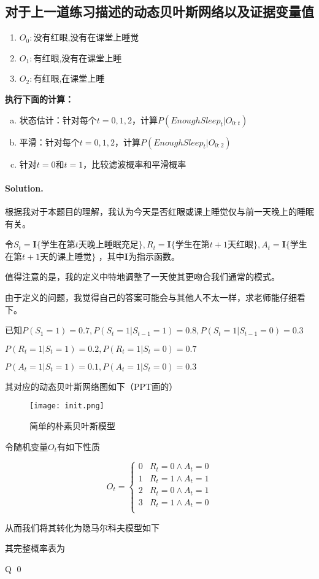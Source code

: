 \documentclass[UTF8]{ctexart}
\newenvironment{solution}
{\color{blue} \paragraph{Solution.}}
{\newline \qed}
\begin{document}
\subsection{对于上一道练习描述的动态贝叶斯网络以及证据变量值}
\begin{enumerate}[1)]
    \item $O_0:$没有红眼,没有在课堂上睡觉
    \item $O_1:$有红眼,没有在课堂上睡
    \item $O_2:$有红眼,在课堂上睡
\end{enumerate}
\textbf{执行下面的计算：}
\begin{enumerate}[a)]
    \item 状态估计：针对每个$t = 0, 1, 2$，计算$P(EnoughSleep_t|O_{0:t})$
    \item 平滑：针对每个$t = 0, 1, 2$，计算$P(EnoughSleep_t|O_{0:2})$
    \item 针对$t=0$和$t=1$，比较滤波概率和平滑概率
\end{enumerate}
\begin{solution}
    根据我对于本题目的理解，我认为今天是否红眼或课上睡觉仅与前一天晚上的睡眠有关。


    令$S_t=\mathbf{I}\{$学生在第$t$天晚上睡眠充足$\},R_t=\mathbf{I}\{$学生在第$t+1$天红眼$\},A_t=\mathbf{I}\{$学生在第$t+1$天的课上睡觉$\}$
    ，其中$\mathbf{I}$为指示函数。

    值得注意的是，我的定义中特地调整了一天使其更吻合我们通常的模式。

    由于定义的问题，我觉得自己的答案可能会与其他人不太一样，求老师能仔细看下。 

    已知$P(S_1=1)=0.7,P(S_t=1|S_{t-1}=1)=0.8,P(S_t=1|S_{t-1}=0)=0.3$

    $P(R_t=1|S_{t}=1)=0.2,P(R_t=1|S_{t}=0)=0.7$

    $P(A_t=1|S_{t}=1)=0.1,P(A_t=1|S_{t}=0)=0.3$

    其对应的动态贝叶斯网络图如下（PPT画的）

    \begin{figure}[ht]
        \centering
        \texttt{[image: init.png]}%
        \caption{简单的朴素贝叶斯模型}
    \end{figure}



    令随机变量$O_t$有如下性质

    \[ 
    O_t= 
    \begin{cases}
        0 &  R_t=0 \wedge A_t=0\\ 
        
        1 & R_t=1 \wedge A_t=1\\
        
        2 &  R_t=0 \wedge A_t=1\\

        3 & R_t=1 \wedge A_t=0\\
    \end{cases} 
    \] 

    从而我们将其转化为隐马尔科夫模型如下



    其完整概率表为


Q
\end{solution}
\end{document}
